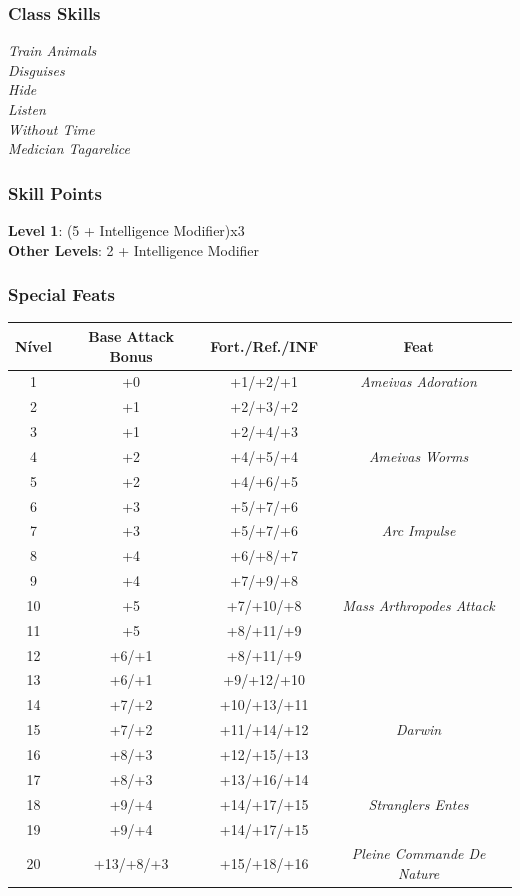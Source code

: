 \documentclass[ letterpaper,12pt]{article}
\begin{document}
\subsubsection{Class Skills}
{\it 
Train Animals\\
Disguises\\
Hide\\
Listen\\
Without Time\\
Medician Tagarelice
}\\

\subsubsection{Skill Points}
{\bf Level 1}: (5 + Intelligence Modifier)x3\\
{\bf Other Levels}: 2 + Intelligence Modifier\\

\subsubsection{Special Feats}

\begin{center} \begin{tabular}{|c||c|c|c|}
\hline
{\bf Nível}&{\bf Base Attack Bonus}&{\bf Fort./Ref./INF}&{\bf Feat}\\
\hline
1&+0&+1/+2/+1&{\it Ameivas Adoration}\\
\hline
2&+1&+2/+3/+2&\\
\hline
3&+1&+2/+4/+3&\\
\hline
4&+2&+4/+5/+4&{\it Ameivas Worms}\\
\hline
5&+2&+4/+6/+5&{\it }\\
\hline
6&+3&+5/+7/+6&\\
\hline
7&+3&+5/+7/+6&{\it Arc Impulse}\\
\hline
8&+4&+6/+8/+7&\\
\hline
9&+4&+7/+9/+8&\\
\hline
10&+5&+7/+10/+8&{\it Mass Arthropodes Attack}\\
\hline
11&+5&+8/+11/+9&\\
\hline
12&+6/+1&+8/+11/+9&\\
\hline
13&+6/+1&+9/+12/+10&\\
\hline
14&+7/+2&+10/+13/+11&\\
\hline
15&+7/+2&+11/+14/+12&{\it Darwin }\\
\hline
16&+8/+3&+12/+15/+13&\\
\hline
17&+8/+3&+13/+16/+14&\\
\hline
18&+9/+4&+14/+17/+15&{\it Stranglers Entes}\\
\hline
19&+9/+4&+14/+17/+15&\\
\hline
20&+13/+8/+3&+15/+18/+16&{\it Pleine Commande De Nature }\\
\hline
\end{tabular} \end{center}
\end{document}
